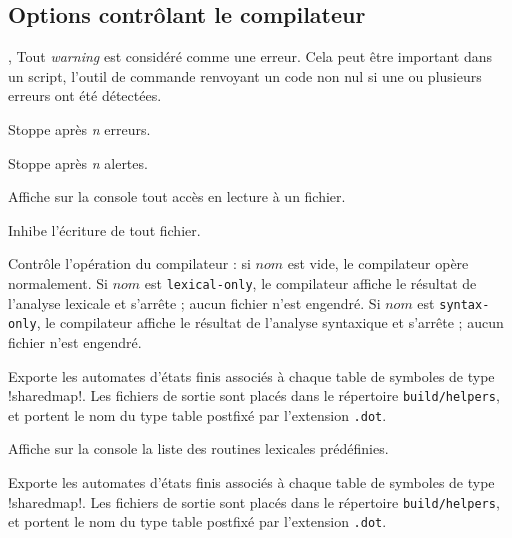 \subsection{Options contrôlant le compilateur}





,  Tout \emph{warning} est considéré comme une erreur. Cela peut être important dans un script, l’outil de commande renvoyant un code non nul si une ou plusieurs erreurs ont été détectées.

 Stoppe après \emph{n} erreurs.

 Stoppe après \emph{n} alertes.







 Affiche sur la console tout accès en lecture à un fichier.


 Inhibe l'écriture de tout fichier.


 Contrôle l'opération du compilateur : si $nom$ est vide, le compilateur opère normalement. Si $nom$ est \texttt{lexical-only}, le compilateur affiche le résultat de l'analyse lexicale et s'arrête ; aucun fichier n'est engendré. Si $nom$ est \texttt{syntax-only}, le compilateur affiche le résultat de l'analyse syntaxique et s'arrête ; aucun fichier n'est engendré.



 Exporte les automates d'états finis associés à chaque table de symboles de type \ggs!sharedmap!. Les fichiers de sortie sont placés dans le répertoire \texttt{build/helpers}, et portent le nom du type table postfixé par l'extension \texttt{.dot}.




 Affiche sur la console la liste des routines lexicales prédéfinies.


 Exporte les automates d'états finis associés à chaque table de symboles de type \ggs!sharedmap!. Les fichiers de sortie sont placés dans le répertoire \texttt{build/helpers}, et portent le nom du type table postfixé par l'extension \texttt{.dot}.





